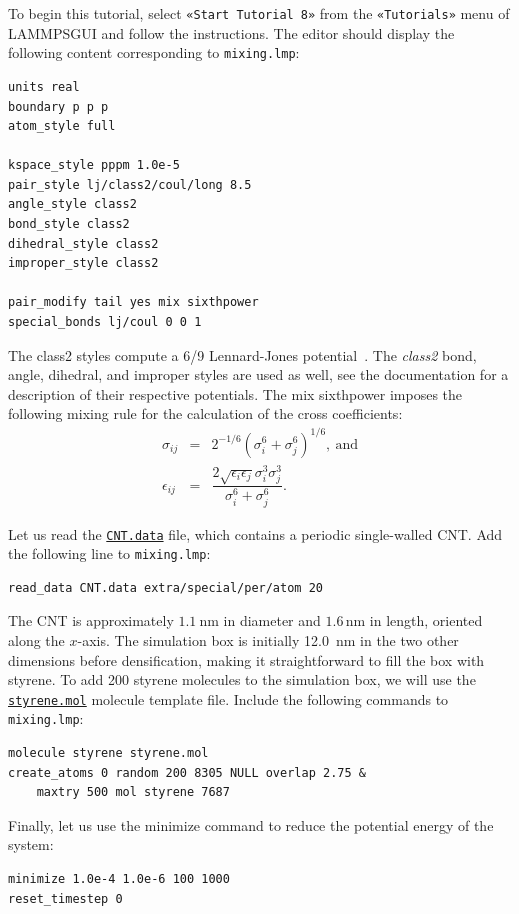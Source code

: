 \documentclass[9pt,tutorial]{livecoms}
\newcommand{\lmpcmd}[1]{\hspace{0pt}\colorbox{listing}{\textcolor{command}{\small{#1}}}\hspace{0pt}} %
\newcommand{\flecmd}[1]{\textcolor{command}{\texttt{#1}}} %
\newcommand{\guicmd}[1]{\textcolor{command}{\texttt{«#1»}}} %
\newcommand{\dwlcmd}[1]{\textcolor{download}{\texttt{#1}}} %
\newcommand{\lammpsgui}{\textsf{LAMMPS\textendash GUI}}
\newcommand{\filepath}{https://raw.githubusercontent.com/lammpstutorials/lammpstutorials-article/main/files/}
\begin{document}
To begin this tutorial, select \guicmd{Start Tutorial 8} from the
\guicmd{Tutorials} menu of \lammpsgui{} and follow the instructions.
The editor should display the following content corresponding to \flecmd{mixing.lmp}:
\begin{lstlisting}
units real
boundary p p p
atom_style full

kspace_style pppm 1.0e-5
pair_style lj/class2/coul/long 8.5
angle_style class2
bond_style class2
dihedral_style class2
improper_style class2

pair_modify tail yes mix sixthpower
special_bonds lj/coul 0 0 1
\end{lstlisting}
The \lmpcmd{class2} styles compute a 6/9 Lennard-Jones potential~\cite{sun1998compass}.
The \textit{class2} bond, angle, dihedral, and improper styles are used as
well, see the documentation for a description of their respective potentials.
The \lmpcmd{mix sixthpower} imposes the following mixing rule for the calculation
of the cross coefficients:
\begin{eqnarray}
\nonumber
\sigma_{ij} & = & 2^{-1/6} (\sigma^6_i+\sigma_j^6)^{1/6}, ~ \text{and} \\
\nonumber
\epsilon_{ij} & = & \dfrac{2 \sqrt{\epsilon_i \epsilon_j} \sigma^3_i \sigma^3_j}{\sigma^6_i+\sigma_j^6}.
\end{eqnarray}

Let us read the \href{\filepath tutorial8/CNT.data}{\dwlcmd{CNT.data}} file, which
contains a periodic single-walled CNT.  Add the following line to \flecmd{mixing.lmp}:
\begin{lstlisting}
read_data CNT.data extra/special/per/atom 20
\end{lstlisting}
The CNT is approximately $1.1~\text{nm}$ in diameter and $1.6\,\text{nm}$ in length, oriented
along the $x$-axis. The simulation box is initially 12.0~nm in the two other dimensions before densification,
making it straightforward to fill the box with styrene.
To add 200 styrene molecules to the simulation box, we will use the
\href{\filepath tutorial8/styrene.mol}{\dwlcmd{styrene.mol}} molecule template file.
Include the following commands to \flecmd{mixing.lmp}:
\begin{lstlisting}
molecule styrene styrene.mol
create_atoms 0 random 200 8305 NULL overlap 2.75 &
    maxtry 500 mol styrene 7687
\end{lstlisting}
Finally, let us use the \lmpcmd{minimize} command to reduce the potential energy of the system:
\begin{lstlisting}
minimize 1.0e-4 1.0e-6 100 1000
reset_timestep 0
\end{lstlisting}
\end{document}
